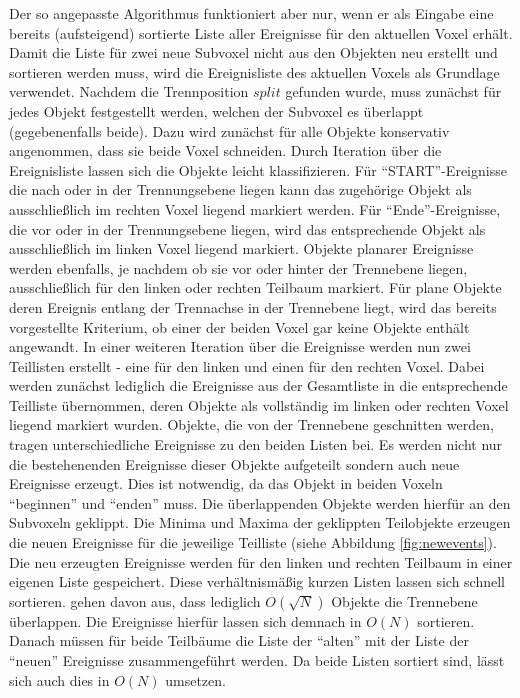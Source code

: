 Der so angepasste Algorithmus funktioniert aber nur, wenn er als Eingabe eine bereits (aufsteigend) sortierte Liste aller Ereignisse für den aktuellen Voxel erhält. Damit die Liste für zwei neue Subvoxel nicht aus den Objekten neu erstellt und sortieren werden muss, wird die Ereignisliste des aktuellen Voxels als Grundlage verwendet.
Nachdem die Trennposition $split$ gefunden wurde, muss zunächst für jedes Objekt festgestellt werden, welchen der Subvoxel es überlappt (gegebenenfalls beide). Dazu wird zunächst für alle Objekte konservativ angenommen, dass sie beide Voxel schneiden. Durch Iteration über die Ereignisliste lassen sich die Objekte leicht klassifizieren. Für ``START''-Ereignisse die nach oder in der Trennungsebene liegen kann das zugehörige Objekt als ausschließlich im rechten Voxel liegend markiert werden. Für ``Ende''-Ereignisse, die vor oder in der Trennungsebene liegen, wird das entsprechende Objekt als ausschließlich im linken Voxel liegend markiert. Objekte planarer Ereignisse werden ebenfalls, je nachdem ob sie vor oder hinter der Trennebene liegen, ausschließlich für den linken oder rechten Teilbaum markiert. Für plane Objekte deren Ereignis entlang der Trennachse in der Trennebene liegt, wird das bereits vorgestellte Kriterium, ob einer der beiden Voxel gar keine Objekte enthält angewandt.
In einer weiteren Iteration über die Ereignisse werden nun zwei Teillisten erstellt - eine für den linken und einen für den rechten Voxel. Dabei werden zunächst lediglich die Ereignisse aus der Gesamtliste in die entsprechende Teilliste übernommen, deren Objekte als vollständig im linken oder rechten Voxel liegend markiert wurden.
Objekte, die von der Trennebene geschnitten werden, tragen unterschiedliche Ereignisse zu den beiden Listen bei. Es werden nicht nur die bestehenenden Ereignisse dieser Objekte aufgeteilt sondern auch neue Ereignisse erzeugt. Dies ist notwendig, da das Objekt in beiden Voxeln ``beginnen'' und ``enden'' muss. Die überlappenden Objekte werden hierfür an den Subvoxeln geklippt. Die Minima und Maxima der geklippten Teilobjekte erzeugen die neuen Ereignisse für die jeweilige Teilliste (siehe Abbildung \ref{fig:newevents}). Die neu erzeugten Ereignisse werden für den linken und rechten Teilbaum in einer eigenen Liste gespeichert. Diese verhältnismäßig kurzen Listen lassen sich schnell sortieren. \cite{WaldHavran06} gehen davon aus, dass lediglich $O(\sqrt{N})$ Objekte die Trennebene überlappen. Die Ereignisse hierfür lassen sich demnach in $O(N)$ sortieren.
Danach müssen für beide Teilbäume die Liste der ``alten'' mit der Liste der ``neuen'' Ereignisse zusammengeführt werden. Da beide Listen sortiert sind, lässt sich auch dies in $O(N)$ umsetzen.

